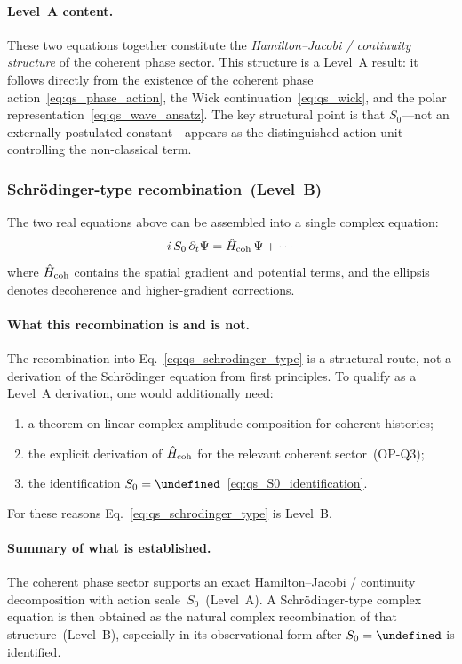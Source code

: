 \documentclass[11pt,a4paper]{article}
\let\hbar\undefined
\numberwithin{equation}{section}
\begin{document}
\paragraph{Level~A content.}
These two equations together constitute the
\emph{Hamilton--Jacobi / continuity structure} of the coherent phase
sector.
This structure is a Level~A result: it follows directly from the
existence of the coherent phase action~\eqref{eq:qs_phase_action},
the Wick continuation~\eqref{eq:qs_wick}, and the polar
representation~\eqref{eq:qs_wave_ansatz}.
The key structural point is that $S_0$---not an externally postulated
constant---appears as the distinguished action unit controlling the
non-classical term.

\subsubsection*{Schr\"odinger-type recombination~(Level~B)}

The two real equations above can be assembled into a single complex
equation:
\begin{equation}
  \label{eq:qs_schrodinger_type}
  i\,S_0\,\partial_t\Psi
  =
  \hat{H}_{\rm coh}\,\Psi
  + \cdots
\end{equation}
where $\hat{H}_{\rm coh}$ contains the spatial gradient and potential
terms, and the ellipsis denotes decoherence and higher-gradient
corrections.

\paragraph{What this recombination is and is not.}
The recombination into Eq.~\eqref{eq:qs_schrodinger_type} is a
structural route, not a derivation of the Schr\"odinger equation
from first principles.
To qualify as a Level~A derivation, one would additionally need:
\begin{enumerate}[label=(\roman*)]
  \item a theorem on linear complex amplitude composition for
    coherent histories;
  \item the explicit derivation of $\hat{H}_{\rm coh}$ for the
    relevant coherent sector~(OP-Q3);
  \item the identification $S_0=\hbar$~\eqref{eq:qs_S0_identification}.
\end{enumerate}
For these reasons Eq.~\eqref{eq:qs_schrodinger_type} is Level~B.

\paragraph{Summary of what is established.}
The coherent phase sector supports an exact Hamilton--Jacobi /
continuity decomposition with action scale~$S_0$~(Level~A).
A Schr\"odinger-type complex equation is then obtained as the
natural complex recombination of that structure~(Level~B), especially
in its observational form after $S_0=\hbar$ is identified.
\end{document}
